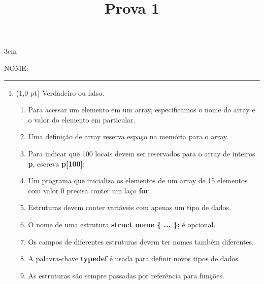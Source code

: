 \documentclass[a4paper,10pt]{article}
\title{Prova 1}
\begin{document}
\maketitle

\emergencystretch 3em



NOME: \rule{.85\textwidth}{0.1mm}

\begin{multicols*}{2}
\setlength{\leftmargini}{0pt}
\begin{enumerate}
  \item (1,0 pt) Verdadeiro ou falso.

  \begin{enumerate}

    \item Para acessar um elemento em um array, especificamos o nome do array e o valor do elemento em particular.
    \item Uma definição de array reserva espaço na memória para o array.
    \item Para indicar que 100 locais devem ser reservados para o array de inteiros \textbf{p}, escreva \textbf{p[100]};
    \item Um programa que inicializa os elementos de um array de 15 elementos com valor 0 precisa conter um laço \textbf{for}.


    \item Estruturas devem conter variáveis com apenas um tipo de dados.
    \item O nome de uma estrutura \textbf{struct nome \{ ... \};} é opcional.
    \item Os campos de diferentes estruturas devem ter nomes também diferentes.
    \item A palavra-chave \textbf{typedef} é usada para definir novos tipos de dados.
    \item As estruturas são sempre passadas por referência para funções.


\end{enumerate}
\end{enumerate}
\end{multicols*}
\end{document}
